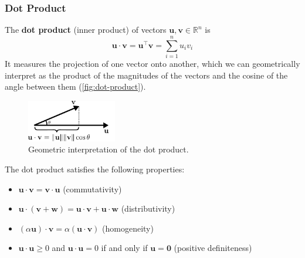 \subsubsection{Dot Product}
The \textbf{dot product} (inner product) of vectors $ \mathbf{u}, \mathbf{v} \in \mathbb{R}^n $ is
\begin{equation*}
    \mathbf{u}\cdot\mathbf{v} = \mathbf{u}^\top \mathbf{v} = \sum_{i=1}^n u_i v_i
\end{equation*}
It measures the projection of one vector onto another, which we can geometrically interpret as the product of the magnitudes of the vectors and the cosine of the angle between them (\autoref{fig:dot-product}).

\begin{figure}[H]
    \centering
    \includegraphics[width=0.35\textwidth]{figs/linear-algebra/dot-product.pdf}
    \caption{Geometric interpretation of the dot product.}
    \label{fig:dot-product}
\end{figure}

The dot product satisfies the following properties:
\begin{itemize}
    \item $ \mathbf{u} \cdot \mathbf{v} = \mathbf{v} \cdot \mathbf{u} $ (commutativity)
    \item $ \mathbf{u} \cdot (\mathbf{v} + \mathbf{w}) = \mathbf{u} \cdot \mathbf{v} + \mathbf{u} \cdot \mathbf{w} $ (distributivity)
    \item $ (\alpha \mathbf{u}) \cdot \mathbf{v} = \alpha (\mathbf{u} \cdot \mathbf{v}) $ (homogeneity)
    \item $ \mathbf{u} \cdot \mathbf{u} \geq 0 $ and $ \mathbf{u} \cdot \mathbf{u} = 0 $ if and only if $ \mathbf{u} = \mathbf{0} $ (positive definiteness)
\end{itemize}

